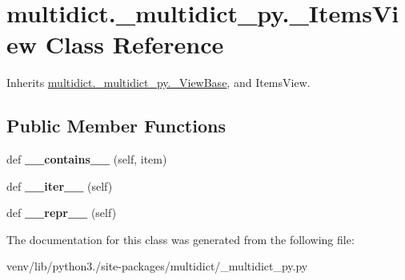 \hypertarget{classmultidict_1_1__multidict__py_1_1___items_view}{}\section{multidict.\+\_\+multidict\+\_\+py.\+\_\+\+Items\+View Class Reference}
\label{classmultidict_1_1__multidict__py_1_1___items_view}


Inherits \hyperlink{classmultidict_1_1__multidict__py_1_1___view_base}{multidict.\+\_\+multidict\+\_\+py.\+\_\+\+View\+Base}, and Items\+View.

\subsection*{Public Member Functions}
\begin{DoxyCompactItemize}
\item 
\mbox{\label{classmultidict_1_1__multidict__py_1_1___items_view_a66ca182fd4d3a0e126d96f7832c5ca1c}} 
def {\bfseries \+\_\+\+\_\+contains\+\_\+\+\_\+} (self, item)
\item 
\mbox{\label{classmultidict_1_1__multidict__py_1_1___items_view_a9de2061c73aebb379773068d080b1f23}} 
def {\bfseries \+\_\+\+\_\+iter\+\_\+\+\_\+} (self)
\item 
\mbox{\label{classmultidict_1_1__multidict__py_1_1___items_view_a874f68425daa2621c523aa0c252d7801}} 
def {\bfseries \+\_\+\+\_\+repr\+\_\+\+\_\+} (self)
\end{DoxyCompactItemize}


The documentation for this class was generated from the following file\+:\begin{DoxyCompactItemize}
\item 
venv/lib/python3./site-\/packages/multidict/\+\_\+multidict\+\_\+py.\+py\end{DoxyCompactItemize}
